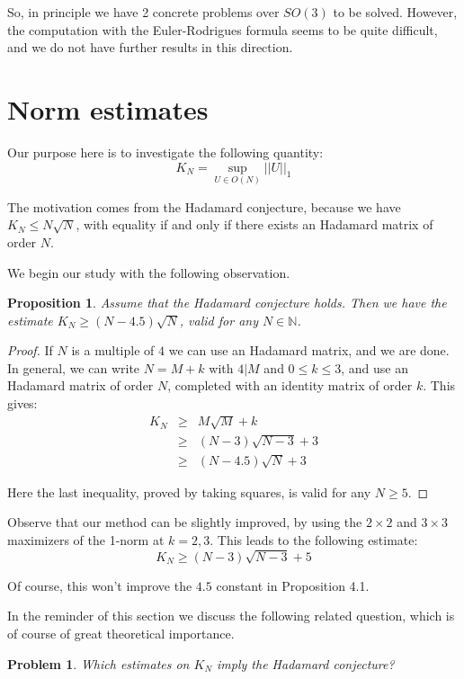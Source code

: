 \documentclass[12pt]{amsart}
\newtheorem{proposition}[theorem]{Proposition}
\newtheorem{problem}[theorem]{Problem}
\begin{document}
So, in principle we have 2 concrete problems over $SO(3)$ to be solved. However, the computation with the Euler-Rodrigues formula seems to be quite difficult, and we do not have further results in this direction.

\section{Norm estimates}

Our purpose here is to investigate the following quantity:
$$K_N=\sup_{U\in O(N)}||U||_1$$

The motivation comes from the Hadamard conjecture, because we have $K_N\leq N\sqrt{N}$, with equality if and only if there exists an Hadamard matrix of order $N$.

We begin our study with the following observation.

\begin{proposition}
Assume that the Hadamard conjecture holds. Then we have the estimate $K_N\geq (N-4.5)\sqrt{N}$, valid for any $N\in\mathbb N$.
\end{proposition}

\begin{proof}
If $N$ is a multiple of $4$ we can use an Hadamard matrix, and we are done. In general, we can write $N=M+k$ with $4|M$ and $0\leq k\leq 3$, and use an Hadamard matrix of order $N$, completed with an identity matrix of order $k$. This gives:
\begin{eqnarray*}
K_N
&\geq&
M\sqrt{M}+k\\
&\geq&(N-3)\sqrt{N-3}+3\\
&\geq&(N-4.5)\sqrt{N}+3
\end{eqnarray*}

Here the last inequality, proved by taking squares, is valid for any $N\geq 5$. 
\end{proof}

Observe that our method can be slightly improved, by using the $2\times2$ and $3\times 3$ maximizers of the 1-norm at $k=2,3$. This leads to the following estimate:
$$K_N\geq (N-3)\sqrt{N-3}+5$$

Of course, this won't improve the $4.5$ constant in Proposition 4.1.

In the reminder of this section we discuss the following related question, which is of course of great theoretical importance.

\begin{problem}
Which estimates on $K_N$ imply the Hadamard conjecture?
\end{problem}
\end{document}
